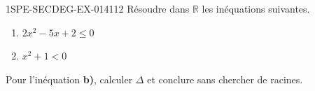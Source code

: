 \begin{exercice}{1SPE-SECDEG-EX-014}{1}{12}
Résoudre dans $\mathbb{R}$ les inéquations suivantes.

\begin{enumerate}
  \item $2x^2 - 5x + 2 \leqslant 0$
  \item $x^2 + 1 < 0$
\end{enumerate}

Pour l'inéquation \textbf{b)}, calculer $\Delta$ et conclure sans chercher de racines.
\end{exercice}
